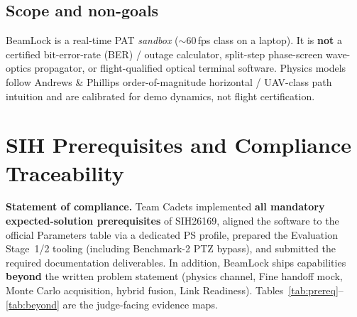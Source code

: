 \documentclass[11pt,a4paper]{article}
\begin{document}
\subsection{Scope and non-goals}
BeamLock is a real-time PAT \emph{sandbox} ($\sim$60\,fps class on a laptop).
It is \textbf{not} a certified bit-error-rate (BER) / outage calculator, split-step phase-screen wave-optics propagator, or flight-qualified optical terminal software.
Physics models follow Andrews \& Phillips order-of-magnitude horizontal / UAV-class path intuition and are calibrated for demo dynamics, not flight certification.

\section{SIH Prerequisites and Compliance Traceability}
\label{sec:compliance}

\noindent\textbf{Statement of compliance.}
Team Cadets implemented \textbf{all mandatory expected-solution prerequisites} of SIH26169, aligned the software to the official Parameters table via a dedicated PS profile, prepared the Evaluation Stage~1/2 tooling (including Benchmark-2 PTZ bypass), and submitted the required documentation deliverables.
In addition, BeamLock ships capabilities \textbf{beyond} the written problem statement (physics channel, Fine handoff mock, Monte Carlo acquisition, hybrid fusion, Link Readiness).
Tables~\ref{tab:prereq}--\ref{tab:beyond} are the judge-facing evidence maps.
\end{document}
